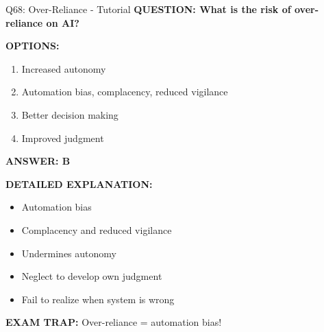 \documentclass[8pt]{beamer}
\begin{document}
	\begin{frame}{Q68: Over-Reliance - Tutorial}
		\fontsize{6.5}{7.5}\selectfont
		\textbf{QUESTION: What is the risk of over-reliance on AI?}
		
		\vspace{0.1cm}
		\textbf{OPTIONS:}
		\begin{enumerate}
			\item Increased autonomy
			\item Automation bias, complacency, reduced vigilance
			\item Better decision making
			\item Improved judgment
		\end{enumerate}
		
		\vspace{0.1cm}
		\textcolor{myblue}{\textbf{ANSWER: B}}
		
		\vspace{0.1cm}
		\textbf{DETAILED EXPLANATION:}
		\begin{itemize}
			\item Automation bias
			\item Complacency and reduced vigilance
			\item Undermines autonomy
			\item Neglect to develop own judgment
			\item Fail to realize when system is wrong
		\end{itemize}
		
		\vspace{0.1cm}
		\textcolor{myred}{\textbf{EXAM TRAP:}} Over-reliance = \textcolor{myblue}{automation bias}!
	\end{frame}
	
\end{document}
